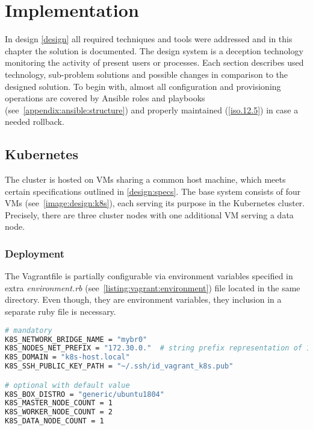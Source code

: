 \chapter{Implementation \label{implementation}}
In design \autoref{design} all required techniques and tools were addressed and in this chapter the solution is documented. The design system is a deception technology monitoring the activity of present users or processes. Each section describes used technology, sub-problem solutions and possible changes in comparison to the designed solution. To begin with, almost all configuration and provisioning operations are covered by Ansible roles and playbooks (see~\autoref{appendix:ansible:structure}) and properly maintained (\ref{iso.12.5}) in case a needed rollback.

\section{Kubernetes \label{implementation:k8s}}
The cluster is hosted on VMs sharing a common host machine, which meets certain specifications outlined in \autoref{design:specs}. The base system consists of four VMs (see~\autoref{image:design:k8s}), each serving its purpose in the Kubernetes cluster. Precisely, there are three cluster nodes with one additional VM serving a data node.

\subsection{Deployment \label{implementation:k8s:deploy}}
The Vagrantfile is partially configurable via environment variables specified in extra \textit{environment.rb} (see~\autoref{listing:vagrant:environment}) file located in the same directory. Even though, they are environment variables, they inclusion in a separate ruby file is necessary.

\begin{lstlisting}[language=bash, style=custom, caption={Contents of the \textit{environment.rb}. These all available variables to configure a new deployment in different environment. Applying these variables, Vagrant create four (one master, two worker and one data node) based on \textit{generic/ubuntu1804} box. Furthermore connects each node to \textit{mybr0} network bridge and sequentially assigns IP addresses and hostnames based on the \texttt{172.30.0.0/24} network and \texttt{k8s-host.local} higher level domain respectively.}, label=listing:vagrant:environment]
# mandatory 
K8S_NETWORK_BRIDGE_NAME = "mybr0"
K8S_NODES_NET_PREFIX = "172.30.0."  # string prefix representation of 172.30.0.0/24
K8S_DOMAIN = "k8s-host.local"
K8S_SSH_PUBLIC_KEY_PATH = "~/.ssh/id_vagrant_k8s.pub"

# optional with default value
K8S_BOX_DISTRO = "generic/ubuntu1804"
K8S_MASTER_NODE_COUNT = 1
K8S_WORKER_NODE_COUNT = 2
K8S_DATA_NODE_COUNT = 1
\end{lstlisting}

